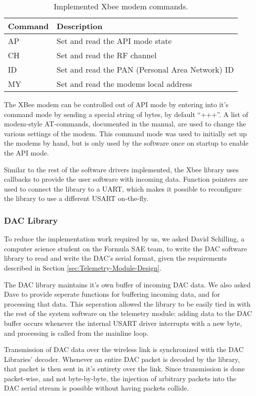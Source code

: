 \begin{table}
\caption{Implemented Xbee modem commands.\label{tab:xbee_commands}}
\centering{}
\begin{tabular}{|l|l|}
\hline 
Command & Description \tabularnewline
\hline
\hline
AP & Set and read the API mode state \tabularnewline
\hline
CH & Set and read the RF channel \tabularnewline
\hline 
ID & Set and read the PAN (Personal Area Network) ID \tabularnewline
\hline
MY & Set and read the modems local address \tabularnewline
\hline
\end{tabular}
\end{table}

The XBee modem can be controlled out of API mode by entering into it's command mode by sending a special string of bytes, by default ``+++''. A list of modem-style AT-commands, documented in the manual, are used to change the various settings of the modem. This command mode was used to initially set up the modems by hand, but is only used by the software once on startup to enable the API mode.

Similar to the rest of the software drivers implemented, the Xbee library uses callbacks to provide the user software with incoming data. Function pointers are used to connect the library to a UART, which makes it possible to reconfigure the library to use a different USART on-the-fly.

\subsubsection{DAC Library}

To reduce the implementation work required by us, we asked David Schilling, a computer science student on the Formula SAE team, to write the DAC software library to read and write the DAC's serial format, given the requirements described in Section \ref{sec:Telemetry-Module-Design}.

The DAC library maintains it's own buffer of incoming DAC data. We also asked Dave to provide seperate functions for buffering incoming data, and for processing that data. This seperation allowed the library to be easily tied in with the rest of the system software on the telemetry module: adding data to the DAC buffer occurs whenever the internal USART driver interrupts with a new byte, and processing is called from the mainline loop.

Transmission of DAC data over the wireless link is synchronized with the DAC Libraries' decoder. Whenever an entire DAC packet is decoded by the library, that packet is then sent in it's entirety over the link. Since transmission is done packet-wise, and not byte-by-byte, the injection of arbitrary packets into the DAC serial stream is possible without having packets collide.

